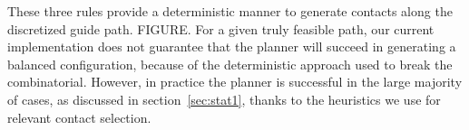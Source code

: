 These three rules provide a deterministic manner to generate contacts along the discretized guide path.
FIGURE. For a given truly feasible path, our current implementation does not guarantee that the planner will succeed in generating a balanced configuration, because
of the deterministic approach used to break the combinatorial.
However, in practice the planner is successful in the large majority of cases, as discussed in section~\ref{sec:stat1}, thanks to 
the heuristics we use for relevant contact selection.
